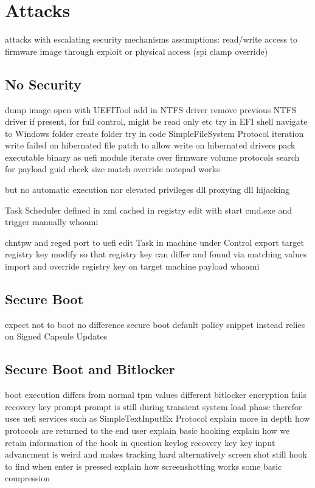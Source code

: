 
\chapter{Attacks}

attacks with escalating security mechanisms
assumptions:
read/write access to firmware image through
exploit or physical access (spi clamp override)

\section{No Security}
dump image
open with UEFITool
add in NTFS driver
remove previous NTFS driver if present, for full control, might be read only etc
try in EFI shell
navigate to Windows folder
create folder
try in code
SimpleFileSystem Protocol iteration
write failed on hibernated file
patch to allow write on hibernated drivers
pack executable binary as uefi module
iterate over firmware volume protocols
search for payload guid
check size match
override notepad works

but no automatic execution nor elevated privileges
dll proxying
dll hijacking

Task Scheduler
defined in xml
cached in registry
edit with start cmd.exe and trigger manually
whoami

chntpw and reged
port to uefi
edit Task in machine under Control
export target registry key
modify so that registry key can differ and found via matching values
import and override registry key on target machine
payload whoami


\section{Secure Boot}
expect not to boot
no difference
secure boot default policy snippet
instead relies on Signed Capsule Updates


\section{Secure Boot and Bitlocker}
boot execution differs from normal
tpm values different
bitlocker encryption fails
recovery key prompt
prompt is still during transient system load phase
therefor uses uefi services such as SimpleTextInputEx Protocol
explain more in depth how protocols are returned to the end user
explain basic hooking
explain how we retain information of the hook in question
keylog recovery key
key input advancment is weird and makes tracking hard
alternatively screen shot
still hook to find when enter is pressed
explain how screenshotting works
some basic compression

